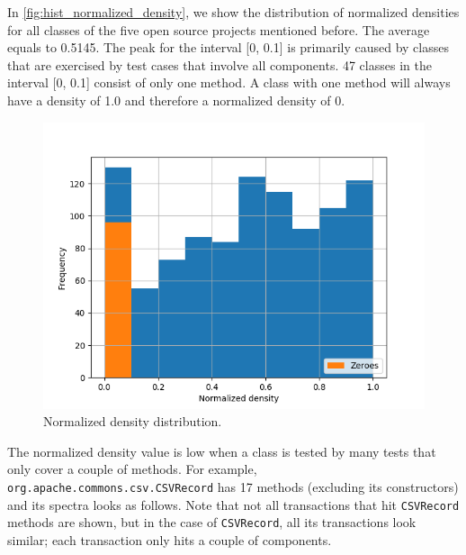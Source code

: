 \documentclass[twoside,a4paper,11pt]{memoir}
\begin{document}
In \autoref{fig:hist_normalized_density}, we show the distribution of normalized densities for all classes of the five open source projects mentioned before.
The average equals to 0.5145.
The peak for the interval [0, 0.1] is primarily caused by classes that are exercised by test cases that involve all components.
47 classes in the interval [0, 0.1] consist of only one method.
A class with one method will always have a density of 1.0 and therefore a normalized density of 0.

\begin{figure}
    \centering
    \includegraphics[width=\linewidth]{figures/histogram_normalized_density}
    \caption{Normalized density distribution.}
    \label{fig:hist_normalized_density}
\end{figure}

The normalized density value is low when a class is tested by many tests that only cover a couple of methods.
For example, \texttt{org.apache.commons.csv.CSVRecord} has 17 methods (excluding its constructors) and its spectra looks as follows.
Note that not all transactions that hit \texttt{CSVRecord} methods are shown, but in the case of \texttt{CSVRecord}, all its transactions look similar; each transaction only hits a couple of components.
\end{document}
